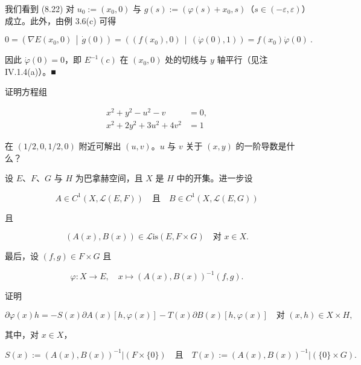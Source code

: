 \begin{example}
\begin{subitems}
我们看到 (8.22) 对 $ u_{0}:=(x_{0},0) $ 与 $ g(s):=(\varphi(s)+x_{0},s) $（$ s\in(-\varepsilon,\varepsilon) $）成立。此外，由例 3.6(c) 可得

\[
0=\left(\nabla E(x_{0},0)\,\middle|\,\dot{g}(0)\right)=\left((f(x_{0}),0)\,\middle|\,(\dot{\varphi}(0),1)\right)=f(x_{0})\dot{\varphi}(0) \ .
\]

因此 $ \dot{\varphi}(0)=0 $，即 $ E^{-1}(c) $ 在 $ (x_{0},0) $ 处的切线与 $ y $ 轴平行（见注 IV.1.4(a)）。\nobreak\hspace{0.35em}■

\end{subitems}

\end{example}

\exerciseshead

\begin{exercises}
\item

证明方程组

\begin{equation*}
\begin{aligned}
x^{2} + y^{2} - u^{2} - v &= 0 , \\ x^{2} + 2y^{2} + 3u^{2} + 4v^{2} &= 1
\end{aligned}
\end{equation*}

在 $ (1/2,0,1/2,0) $ 附近可解出 $ (u,v) $。$ u $ 与 $ v $ 关于 $ (x,y) $ 的一阶导数是什么？

\item

设 $ E $、$ F $、$ G $ 与 $ H $ 为巴拿赫空间，且 $ X $ 是 $ H $ 中的开集。进一步设

\[
A \in C^{1}(X,\mathcal{L}(E,F)) \quad \text{且} \quad B \in C^{1}(X,\mathcal{L}(E,G))
\]

且

\[
(A(x),B(x)) \in \mathcal{L}\mathrm{is}(E,F\times G) \quad \text{对 } x \in X .
\]

最后，设 $ (f,g) \in F\times G $ 且

\[
\varphi : X \to E , \quad x \mapsto (A(x),B(x))^{-1}(f,g) .
\]

证明

\[
\partial\varphi(x)h = -S(x)\partial A(x)[h,\varphi(x)] - T(x)\partial B(x)[h,\varphi(x)] \quad \text{对 } (x,h) \in X\times H ,
\]

其中，对 $ x \in X $，

\[
S(x) := (A(x),B(x))^{-1}\big|(F\times\{0\}) \quad \text{且} \quad T(x) := (A(x),B(x))^{-1}\big|(\{0\}\times G) .
\]
\item


\end{exercises}
